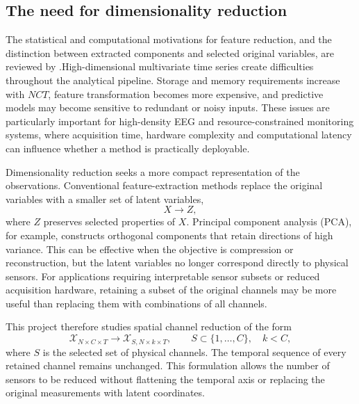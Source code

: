 
\subsection{The need for dimensionality reduction}

The statistical and computational motivations for feature reduction, and
the distinction between extracted components and selected original variables,
are reviewed by
\citet{jolliffe2002pca,jolliffe2016pca,guyon2003feature,
chandrashekar2014feature}.High-dimensional multivariate time series create difficulties throughout the analytical pipeline. Storage and memory requirements increase with $NCT$, feature transformation becomes more expensive, and predictive models may become sensitive to redundant or noisy inputs. These issues are particularly important for high-density EEG and resource-constrained monitoring systems, where acquisition time, hardware complexity and computational latency can influence whether a method is practically deployable.


Dimensionality reduction seeks a more compact representation of the observations. Conventional feature-extraction methods replace the original variables with a smaller set of latent variables,
\begin{equation}
    X \longrightarrow Z,
\end{equation}
where $Z$ preserves selected properties of $X$. Principal component analysis (PCA), for example, constructs orthogonal components that retain directions of high variance. This can be effective when the objective is compression or reconstruction, but the latent variables no longer correspond directly to physical sensors. For applications requiring interpretable sensor subsets or reduced acquisition hardware, retaining a subset of the original channels may be more useful than replacing them with combinations of all channels.

This project therefore studies spatial channel reduction of the form
\begin{equation}
    \mathcal{X}_{N\times C\times T}
    \longrightarrow
    \mathcal{X}_{S,N\times k\times T},
    \qquad S\subset\{1,\ldots,C\},\quad k<C,
    \label{eq:channel-reduction-intro}
\end{equation}
where $S$ is the selected set of physical channels. The temporal sequence of every retained channel remains unchanged. This formulation allows the number of sensors to be reduced without flattening the temporal axis or replacing the original measurements with latent coordinates.

